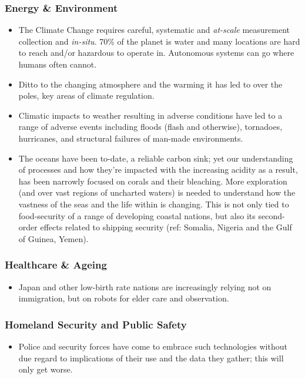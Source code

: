 \documentclass[11pt,letterpaper]{article}
\begin{document}
\subsubsection{Energy \& Environment}
\begin{itemize}

\item The Climate Change requires careful, systematic and
  \emph{at-scale} measurement collection and \emph{in-situ}. 70\% of
  the planet is water and many locations are hard to reach and/or
  hazardous to operate in. Autonomous systems can go where humans
  often cannot.

\item Ditto to the changing atmosphere and the warming it has led to
  over the poles, key areas of climate regulation.

\item Climatic impacts to weather resulting in adverse conditions have
  led to a range of adverse events including floods (flash and
  otherwise), tornadoes, hurricanes, and structural failures of man-made
  environments. 

\item The oceans have been to-date, a reliable carbon sink; yet our
  understanding of processes and how they're impacted with the
  increasing acidity as a result, has been narrowly focused on corals
  and their bleaching. More exploration (and over vast regions of
  uncharted waters) is needed to understand how the vastness of the
  seas and the life within is changing. This is not only tied to
  food-security of a range of developing coastal nations, but also its
  second-order effects related to shipping security (ref: Somalia,
  Nigeria and the Gulf of Guinea, Yemen).

\end{itemize}

\subsubsection{Healthcare \& Ageing}
\begin{itemize}
\item Japan and other low-birth rate nations are increasingly relying
  not on immigration, but on robots for elder care and observation. 

\end{itemize}

\subsubsection{Homeland Security and Public Safety}
\begin{itemize}

\item Police and security forces have come to embrace such
  technologies without due regard to implications of their use and the
  data they gather; this will only get worse.

\end{itemize}
\end{document}
